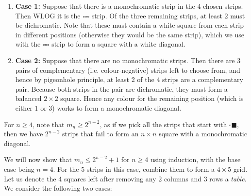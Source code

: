 \documentclass[10pt]{article}
\newcommand{\ws}{\square}
\newcommand{\bs}{\blacksquare}
\begin{document}
	\begin{enumerate}
	\item \textbf{Case 1:} Suppose that there is a monochromatic strip in the 4 chosen strips. Then WLOG it is the \(\ws \ws \ws\) strip. Of the three remaining strips, at least 2 must be dichromatic. Note that these must contain a white square from each strip in different positions (otherwise they would be the same strip), which we use with the \(\ws \ws \ws\) strip to form a square with a white diagonal.
	\item \textbf{Case 2:} Suppose that there are no monochromatic strips. Then there are 3 pairs of complementary (i.e. colour-negative) strips left to choose from, and hence by pigeonhole principle, at least 2 of the 4 strips are a complementary pair. Because both strips in the pair are dichromatic, they must form a balanced \(2 \times 2\) square. Hence any colour for the remaining position (which is either 1 or 3) works to form a monochromatic diagonal.
	\end{enumerate}
	
	For \(n \geq 4\), note that \(m_n \geq 2^{n-2}\), as if we pick all the strips that start with \(\ws \bs\), then we have \(2^{n-2}\) strips that fail to form an \(n \times n\) square with a monochromatic diagonal.
	
	We will now show that $m_n \leq 2^{n-2} + 1$ for $n \geq 4$ using induction, with the base case being \(n = 4\). For the 5 strips in this case, combine them to form a \(4 \times 5\) grid. Let us denote the 4 squares left after removing any 2 columns and 3 rows a \emph{table}. We consider the following two cases:
	
\end{document}
